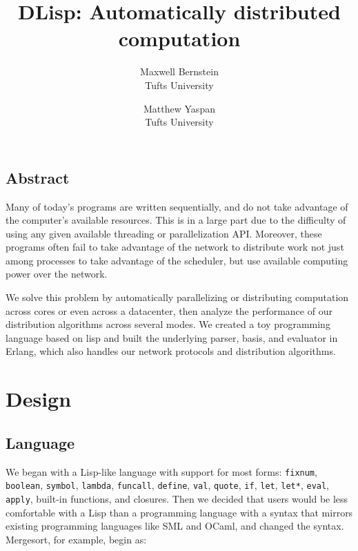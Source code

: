 \documentclass[letterpaper,twocolumn,10pt]{article}
\begin{document}
\date{}

\title{\Large \bf DLisp: Automatically distributed computation}

\newcommand{\tuftsauthor}[1]{{\rm #1}\\
  Tufts University}

\author{
  \tuftsauthor{Maxwell Bernstein}
  \and
  \tuftsauthor{Matthew Yaspan}
}

\maketitle

\subsection*{Abstract}
Many of today's programs are written sequentially, and do not take advantage of
the computer's available resources. This is in a large part due to the
difficulty of using any given available threading or parallelization API.
Moreover, these programs often fail to take advantage of the network
to distribute work not just among processes to take advantage of the
scheduler, but use available computing power over the network.

We solve this problem by automatically parallelizing or distributing
computation across cores or even across a datacenter, then analyze the
performance of our distribution algorithms across several modes. We
created a toy programming language based on lisp and built the underlying
parser, basis, and evaluator in Erlang, which also handles our network
protocols and distribution algorithms.

\section{Design}

\subsection{Language}

We began with a Lisp-like language with support for most forms: \verb|fixnum|,
\verb|boolean|, \verb|symbol|, \verb|lambda|, \verb|funcall|, \verb|define|,
\verb|val|, \verb|quote|, \verb|if|, \verb|let|, \verb|let*|, \verb|eval|,
\verb|apply|, built-in functions, and closures. Then we decided that users
would be less comfortable with a Lisp than a programming language with a syntax
that mirrors existing programming languages like SML and OCaml, and changed the
syntax. Mergesort, for example, begin as:
\end{document}

